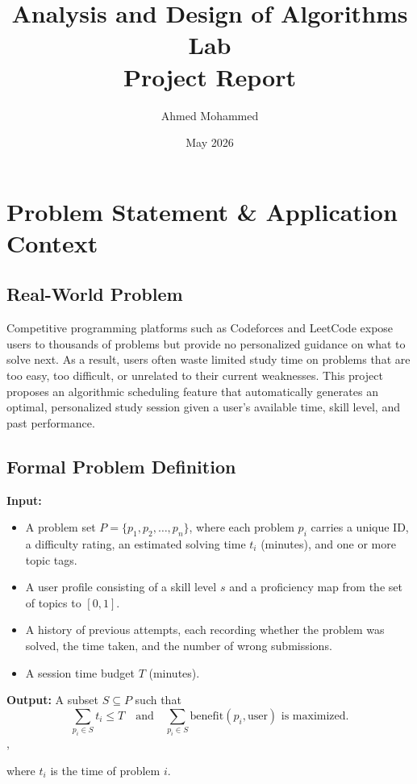 \documentclass{article}
\title{Analysis and Design of Algorithms Lab\\Project Report}
\author{Ahmed Mohammed}
\date{May 2026}
\begin{document}
\parindent=0mm
\maketitle

\section{Problem Statement \& Application Context}
\subsection{Real-World Problem}
 
Competitive programming platforms such as Codeforces and LeetCode expose
users to thousands of problems but provide no personalized guidance on
what to solve next. As a result, users often waste limited study time on
problems that are too easy, too difficult, or unrelated to their current
weaknesses. This project proposes an algorithmic scheduling feature that
automatically generates an optimal, personalized study session given a
user's available time, skill level, and past performance.
 
\subsection{Formal Problem Definition}
 
\textbf{Input:}
\begin{itemize}
\item A problem set $P = \{p_1, p_2, \ldots, p_n\}$, where each
    problem $p_i$ carries a unique ID, a difficulty rating, an
        estimated solving time $t_i$ (minutes), and one or more topic
        tags.
  \item A user profile consisting of a skill level $s$ and a
        proficiency map from the set of topics to $[0, 1]$.
  \item A history of previous attempts, each recording whether the
        problem was solved, the time taken, and the number of wrong
        submissions.
  \item A session time budget $T$ (minutes).
\end{itemize}

\textbf{Output:} A subset $S \subseteq P$ such that
\[
  \sum_{p_i \in S} t_i \leq T
  \quad \text{and} \quad
  \sum_{p_i \in S} \mathrm{benefit}(p_i, \text{user})
  \text{ is maximized.}
\],

where $t_i$ is the time of problem $i$.
\end{document}
